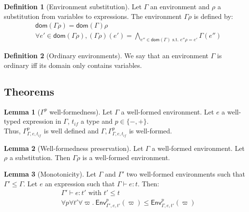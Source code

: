 \documentclass[a4paper]{article}%
\newcommand{\dom}[1]{\textsf{dom}(#1)}
\newcommand{\Gp}[2]{\textsf{Env}^{#1}_{#2}}
\theoremstyle{definition}
\newtheorem{lemma}{Lemma}
\newtheorem{definition}{Definition}
\begin{document}
      \begin{definition}[Environment substitution]
        Let $\Gamma$ an environment and $\rho$ a substitution from variables to expressions.
        The environment $\Gamma\rho$ is defined by:
        \begin{align*}
          &\dom {\Gamma\rho} = \dom \Gamma \rho\\
          &\forall e' \in \dom {\Gamma\rho}, (\Gamma\rho)(e') = \bigwedge_{e'' \in \dom \Gamma \text{ s.t. } e''\rho=e'}\Gamma(e'')
        \end{align*}
      \end{definition}
    
      \begin{definition}[Ordinary environments]
        We say that an environment $\Gamma$ is ordinary iff its domain only contains variables.
      \end{definition}
    
        \subsection{Theorems}

        \begin{lemma}[$\Gamma^p $ well-formedness]
          Let $\Gamma$ a well-formed environment. Let $e$ a well-typed expression in $\Gamma$, $t_{if}$ a type and $p\in\{-,+\}$.\\
          Thus, $\Gamma^p_{\Gamma,e,t_{if}}$ is well defined and $\Gamma,\Gamma^p_{\Gamma,e,t_{if}}$ is well-formed.
        \end{lemma}

        \begin{lemma}[Well-formedness preservation]
          Let $\Gamma$ a well-formed environment. Let $\rho$ a substitution.
          Then $\Gamma\rho$ is a well-formed environment.
        \end{lemma}
    
        \begin{lemma}[Monotonicity]
          Let $\Gamma$ and $\Gamma'$ two well-formed environments such that $\Gamma' \leq \Gamma$. Let $e$ an expression such that $\Gamma \vdash e:t$.
          Then:\\
          \begin{align*}
            &\Gamma' \vdash e:t' \text{ with } t' \leq t\\
            &\forall p \forall t' \forall \varpi.\ \Gp p {\Gamma',e,t'} (\varpi) \leq \Gp p {\Gamma,e,t'} (\varpi)
          \end{align*}
        \end{lemma}
    
\end{document}
